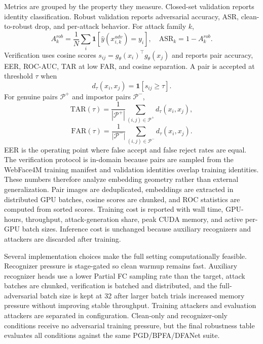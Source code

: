 \documentclass[conference]{IEEEtran}
\begin{document}
Metrics are grouped by the property they measure. Closed-set validation reports
identity classification. Robust validation reports adversarial accuracy, ASR,
clean-to-robust drop, and per-attack behavior. For attack family $k$,
\begin{equation}
    A^{rob}_{k}=\frac{1}{N}\sum_i
    \mathbf{1}[\hat{y}(x^{adv}_{i,k})=y_i],\quad
    \mathrm{ASR}_k=1-A^{rob}_{k}.
\end{equation}
Verification uses cosine scores
$s_{ij}=g_{\theta}(x_i)^\top g_{\theta}(x_j)$ and reports pair accuracy, EER,
ROC-AUC, TAR at low FAR, and cosine separation. A pair is accepted at
threshold $\tau$ when
\begin{equation}
    d_{\tau}(x_i,x_j)=\mathbf{1}[s_{ij}\geq \tau].
\end{equation}
For genuine pairs $\mathcal{P}^{+}$ and impostor pairs $\mathcal{P}^{-}$,
\begin{equation}
    \mathrm{TAR}(\tau)=\frac{1}{|\mathcal{P}^{+}|}
    \sum_{(i,j)\in\mathcal{P}^{+}} d_{\tau}(x_i,x_j),
\end{equation}
\begin{equation}
    \mathrm{FAR}(\tau)=\frac{1}{|\mathcal{P}^{-}|}
    \sum_{(i,j)\in\mathcal{P}^{-}} d_{\tau}(x_i,x_j).
\end{equation}
EER is the operating point where false accept and false reject rates are equal.
The verification protocol is in-domain because pairs are sampled from the
WebFace4M training manifest and validation identities overlap training
identities. These numbers therefore analyze embedding geometry rather than
external generalization. Pair images are deduplicated, embeddings are extracted
in distributed GPU batches, cosine scores are chunked, and ROC statistics are
computed from sorted scores.
Training cost is reported with wall time, GPU-hours, throughput,
attack-generation share, peak CUDA memory, and active per-GPU batch sizes.
Inference cost is unchanged because auxiliary recognizers and attackers are
discarded after training.

Several implementation choices make the full setting computationally feasible.
Recognizer pressure is stage-gated so clean warmup remains fast. Auxiliary
recognizer heads use a lower Partial FC sampling rate than the target, attack
batches are chunked, verification is batched and distributed, and the
full-adversarial batch size is kept at 32 after larger batch trials increased
memory pressure without improving stable throughput. Training attackers and
evaluation attackers are separated in configuration. Clean-only and
recognizer-only conditions receive no adversarial training pressure, but the
final robustness table evaluates all conditions against the same
PGD/BPFA/DFANet suite.
\end{document}
